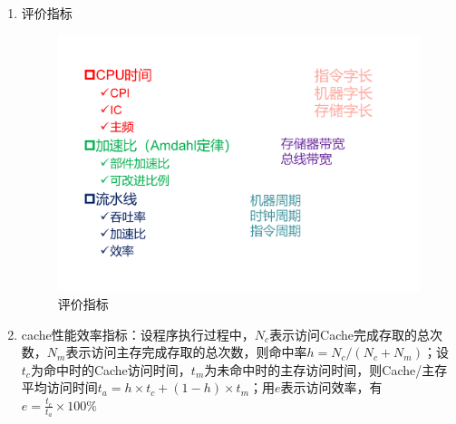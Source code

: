 \documentclass[]{report}
\begin{document}
\begin{enumerate}[label = \textsf{\arabic{*}}]
		\item 评价指标
		\begin{figure}[h]
			\centering
			\includegraphics[scale = 0.25]{images/Evaluate.pdf}
			\caption{评价指标}
		\end{figure}
		\item cache性能效率指标：设程序执行过程中，$N_c$表示访问Cache完成存取的总次数，$N_m$表示访问主存完成存取的总次数，则命中率$h=N_c/(N_c+N_m)$；设$t_c$为命中时的Cache访问时间，$t_m$为未命中时的主存访问时间，则Cache/主存平均访问时间$t_a=h\times t_c+(1-h)\times t_m$；用$e$表示访问效率，有$e=\frac{t_c}{t_a}\times100\%$
	\end{enumerate}
\end{document}
